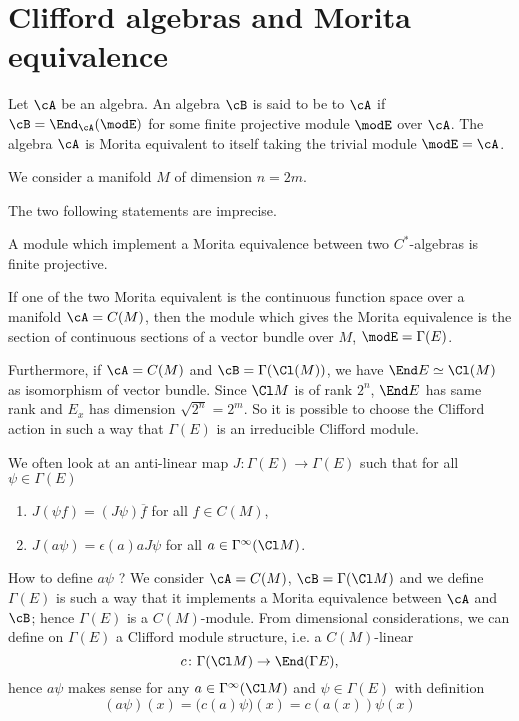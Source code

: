 \section{Clifford algebras and Morita equivalence}

Let $\cA$ be an algebra. An algebra $\cB$ is said to be \label{PgMoritaEq} to $\cA$ if $\cB=\End_{\cA}(\modE)$ for some finite projective module $\modE$ over $\cA$. The algebra $\cA$ is Morita equivalent to itself taking the trivial module $\modE=\cA$.

We consider a manifold $M$ of dimension $n=2m$.

\begin{probleme}
	The two following statements are imprecise.
\end{probleme}

\begin{proposition}
A module which implement a Morita equivalence between two $C^*$-algebras is finite projective.
\end{proposition}

\begin{theorem}
If one of the two Morita equivalent is the continuous function space over a manifold $\cA=C(M)$, then the module which gives the Morita equivalence is the section of continuous sections of a vector bundle over $M$, $\modE=\Gamma(E)$.
\end{theorem}
Furthermore, if $\cA=C(M)$ and $\cB=\Gamma(\Cl(M))$, we have $\End E\simeq \Cl(M)$ as isomorphism of vector bundle. Since $\Cl M$ is of rank $2^n$, $\End E$ has same rank and $E_x$ has dimension $\sqrt{2^n}=2^m$. So it is possible to choose the Clifford action in such a way that $\Gamma(E)$ is an irreducible Clifford module.

We often look at an anti-linear map $J\colon \Gamma(E)\to \Gamma(E)$ such that for all $\psi\in\Gamma(E)$
\begin{enumerate}
\item $J(\psi f)=(J\psi)\overline{ f }$ for all $f\in C(M)$,
\item $J(a\psi)=\epsilon(a)a J\psi$ for all $a\in\Gamma^{\infty}(\Cl M)$.
\end{enumerate}
How to define $a\psi$ ? We consider $\cA=C(M)$, $\cB=\Gamma(\Cl M)$ and we define $\Gamma(E)$ is such a way that it implements a Morita equivalence between $\cA$ and $\cB$; hence $\Gamma(E)$ is a $C(M)$-module. From dimensional considerations, we can define on $\Gamma(E)$ a Clifford module structure, i.e. a $C(M)$-linear
\begin{equation}
  c\colon \Gamma(\Cl M)\to \End(\Gamma E),
\end{equation}
hence $a\psi$ makes sense for any $a\in\Gamma^{\infty}(\Cl M)$ and $\psi\in\Gamma(E)$ with definition
\begin{equation}
 (a\psi)(x)=\big( c(a)\psi \big)(x)
		=c(a(x))\psi(x)
\end{equation}

